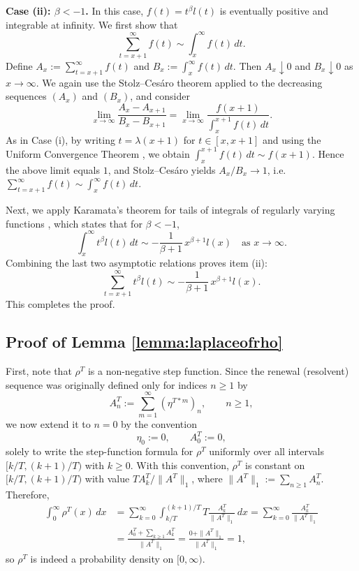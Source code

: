 \documentclass[letterpaper]{article}
\numberwithin{equation}{section}
\theoremstyle{definition}
\theoremstyle{remark}
\begin{document}
{\medskip\noindent\textbf{Case (ii): $\beta<-1$.}}
{In this case, $f(t)=t^\beta l(t)$ is eventually positive and integrable at infinity. We first show that}
\[
{
\sum_{t=x+1}^\infty f(t) \sim \int_x^\infty f(t)\,dt.}
\]
{Define $A_x:=\sum_{t=x+1}^\infty f(t)$ and $B_x:=\int_x^\infty f(t)\,dt$. Then $A_x\downarrow 0$ and $B_x\downarrow 0$ as $x\to\infty$. We again use the Stolz--Ces\'aro theorem applied to the decreasing sequences $(A_x)$ and $(B_x)$, and consider}
\begin{equation*}
{
\lim_{x\to\infty}\frac{A_x-A_{x+1}}{B_x-B_{x+1}}
= \lim_{x\to\infty}\frac{f(x+1)}{\int_x^{x+1} f(t)\,dt}.}
\end{equation*}
{As in Case (i), by writing $t=\lambda(x+1)$ for $t\in[x,x+1]$ and using the Uniform Convergence Theorem \cite[Theorem 1.5.2]{bingham1989regular}, we obtain $\int_x^{x+1} f(t)\,dt \sim f(x+1)$. Hence the above limit equals $1$, and Stolz--Ces\'aro yields $A_x/B_x\to 1$, i.e.\ $\sum_{t=x+1}^\infty f(t)\sim \int_x^\infty f(t)\,dt$.}

{Next, we apply Karamata's theorem for tails of integrals of regularly varying functions \cite[Proposition 1.5.10]{bingham1989regular}, which states that for $\beta<-1$,}
\[
{
\int_x^\infty t^\beta l(t)\,dt \sim -\frac{1}{\beta+1}\,x^{\beta+1}l(x)\quad\text{as }x\to\infty.}
\]
{Combining the last two asymptotic relations proves item (ii):}
\[
{
\sum_{t=x+1}^\infty t^\beta l(t) \sim -\frac{1}{\beta+1}\,x^{\beta+1}l(x).}
\]
This completes the proof.


\subsection{Proof of Lemma \ref{lemma:laplaceofrho}}
\label{subsec:proofoflaplaceofrho}
  {
  First, note that $\rho^T$ is a non-negative step function. Since the renewal (resolvent) sequence was
  originally defined only for indices $n\ge1$ by
  \[
  A_n^T:=\sum_{m=1}^\infty(\eta^{T*m})_n,\qquad n\ge1,
  \]
  we now extend it to $n=0$ by the convention
  \[
  \eta_0:=0,\qquad A_0^T:=0,
  \]
  {solely to write the step-function formula for $\rho^T$ uniformly over all intervals
  $[k/T,(k+1)/T)$ with $k\ge0$.} With this convention, $\rho^T$ is constant on $[k/T,(k+1)/T)$ with value
  $T A_k^T/\|A^T\|_1$, where $\|A^T\|_1:=\sum_{n\ge1}A_n^T$. Therefore,
  \begin{align*}
  \int_0^\infty \rho^T(x)\,dx
  &=\sum_{k=0}^\infty \int_{k/T}^{(k+1)/T} T\frac{A_k^T}{\|A^T\|_1}\,dx
  =\sum_{k=0}^\infty \frac{A_k^T}{\|A^T\|_1} \\
  &=\frac{A_0^T+\sum_{k\ge1}A_k^T}{\|A^T\|_1}
  =\frac{0+\|A^T\|_1}{\|A^T\|_1}=1,
  \end{align*}
  so $\rho^T$ is indeed a probability density on $[0,\infty)$.
  }
\end{document}
